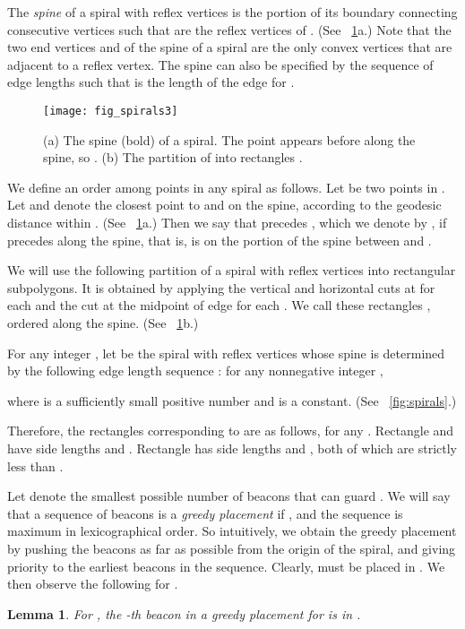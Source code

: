 \documentclass[11pt]{article}
\newtheorem{lemma}{Lemma}
\theoremstyle{definition}
\begin{document}
The \emph{spine} of a spiral  with  reflex vertices is
the portion of its boundary  connecting  consecutive vertices 
such that  are the reflex vertices of . (See \figurename~\ref{fig:spirals3}a.)
Note that the two end vertices  and  of the spine of a spiral
are the only convex vertices that are adjacent to a reflex vertex.
The spine can also be specified by the sequence of edge lengths 
such that  is the length of the edge  for .

\begin{figure}[tb]
\centering
\texttt{[image: fig\_spirals3]}
\caption{(a) The spine (bold) of a spiral. The point  appears before
 along the spine, so . (b) The partition of  into rectangles .
\label{fig:spirals3}}
\end{figure}

We define an order  among points in any spiral  as follows. Let  be two points in .
Let  and  denote the closest point to  and  on the spine, according to the geodesic
distance within .  (See \figurename~\ref{fig:spirals3}a.) Then we say that  precedes , 
which we denote by , if  precedes  along the spine, that is,  
is on the portion of the spine between  and .

We will use the following partition of a spiral  with  reflex vertices 
into  rectangular subpolygons. It is obtained
by applying the vertical and horizontal cuts at  for each 
and the cut at the midpoint of edge  for each .
We call these rectangles , ordered along
the spine. (See \figurename~\ref{fig:spirals3}b.)

For any integer , let  be the spiral with  reflex vertices
whose spine is determined by the following edge length sequence :
for any nonnegative integer ,

where  is a sufficiently small positive number
and  is a constant.
(See \figurename~\ref{fig:spirals}.)

Therefore, the rectangles  corresponding to  are as follows, for any .
Rectangle   and  have side lengths  and .
Rectangle  has side lengths  and , both of which are strictly less than .

Let  denote the smallest possible number of beacons that can guard . We will
say that a sequence of beacons  is a {\it greedy placement} if 
, and the
sequence  is maximum in lexicographical order. 
So intuitively, we obtain the greedy placement
by pushing the beacons as far as possible from the origin  of the spiral, and giving
priority to the earliest beacons in the sequence.
Clearly,  must be placed in .
We then observe the following for .
\begin{lemma} \label{lem:spiral_sub}
 For , the -th beacon  in a greedy placement for 
 is  in .
\end{lemma}
\end{document}
